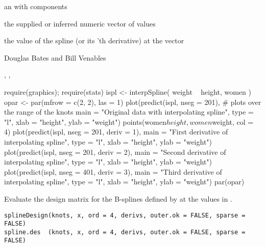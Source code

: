 %
\begin{Value}
an  with components
\begin{ldescription}
\item[\code{x}] the supplied or inferred numeric vector of  values
\item[\code{y}] the value of the spline (or its 'th derivative)
at the  vector
\end{ldescription}
\end{Value}
%
\begin{Author}\relax
Douglas Bates and Bill Venables
\end{Author}
%
\begin{SeeAlso}\relax
{},
,
\end{SeeAlso}
%
\begin{Examples}
\begin{ExampleCode}
require(graphics); require(stats)
ispl <- interpSpline( weight ~ height,  women )
opar <- par(mfrow = c(2, 2), las = 1)
plot(predict(ispl, nseg = 201),     # plots over the range of the knots
     main = "Original data with interpolating spline", type = "l",
     xlab = "height", ylab = "weight") 
points(women$height, women$weight, col = 4)
plot(predict(ispl, nseg = 201, deriv = 1),
     main = "First derivative of interpolating spline", type = "l",
     xlab = "height", ylab = "weight") 
plot(predict(ispl, nseg = 201, deriv = 2),
     main = "Second derivative of interpolating spline", type = "l",
     xlab = "height", ylab = "weight") 
plot(predict(ispl, nseg = 401, deriv = 3),
     main = "Third derivative of interpolating spline", type = "l",
     xlab = "height", ylab = "weight") 
par(opar)
\end{ExampleCode}
\end{Examples}
%
\begin{Description}\relax
Evaluate the design matrix for the B-splines defined by 
at the values in .
\end{Description}
%
\begin{Usage}
\begin{verbatim}
splineDesign(knots, x, ord = 4, derivs, outer.ok = FALSE, sparse = FALSE)
spline.des  (knots, x, ord = 4, derivs, outer.ok = FALSE, sparse = FALSE)
\end{verbatim}
\end{Usage}
